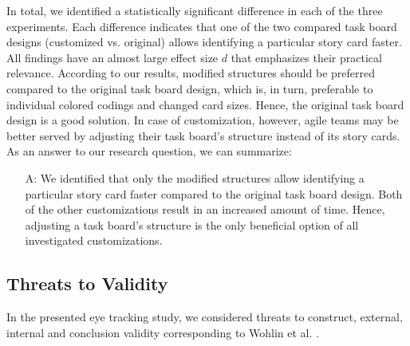 \documentclass{llncs}
\begin{document}
In total, we identified a statistically significant difference in each of the 
three experiments. Each difference indicates that one of the two compared task 
board designs (customized vs. original) allows identifying a particular story 
card faster. All findings have an almost large effect size $d$ that emphasizes 
their practical relevance. According to our results, modified structures should 
be preferred compared to the original task board design, which is, in turn, 
preferable to individual colored codings and changed card sizes. Hence, the 
original task board design is a good solution. In case of customization, 
however, agile teams may be better served by adjusting their task board's 
structure instead of its story cards. As an answer to our research question, we 
can summarize:
\begin{itemize}
	\item[A:] We identified that only the modified structures allow identifying 
	a particular story card faster compared to the original task board design. 
	Both of the other customizations result in an increased amount of time. 
	Hence, adjusting a task board's structure is the only beneficial option of 
	all investigated customizations.
\end{itemize}

\subsection{Threats to Validity}
In the presented eye tracking study, we considered threats to construct, 
external, internal and conclusion validity corresponding to Wohlin et al. 
\cite{Wohlin.2012}.
\end{document}
